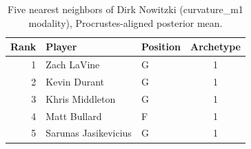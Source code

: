 \begin{table}[htbp]
  \centering\small
  \begin{tabular}{rllc}
    \toprule
    Rank & Player & Position & Archetype \\
    \midrule
    1 & Zach LaVine & G & 1 \\
    2 & Kevin Durant & G & 1 \\
    3 & Khris Middleton & G & 1 \\
    4 & Matt Bullard & F & 1 \\
    5 & Sarunas Jasikevicius & G & 1 \\
    \bottomrule
  \end{tabular}
  \caption{Five nearest neighbors of Dirk Nowitzki (curvature_m1 modality), Procrustes-aligned posterior mean.}
  \label{tab:Dirk_Nowitzki_neighbors_curvature_m1}
\end{table}

